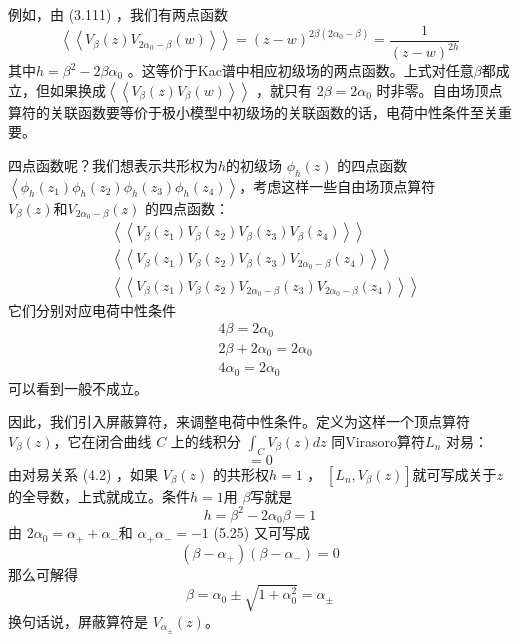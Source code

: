 例如，由 (3.111) ，我们有两点函数
\begin{equation}
	\left\langle\left\langle V_{\beta}(z) V_{2 \alpha_{0}-\beta}(w)\right\rangle\right\rangle=(z-w)^{2 \beta\left(2 \alpha_{0}-\beta\right)}=\frac{1}{(z-w)^{2 h}}
\end{equation}
其中$ h=\beta^{2}-2 \beta \alpha_{0}$ 。这等价于Kac谱中相应初级场的两点函数。上式对任意$ \beta $都成立，但如果换成$\left\langle\left\langle V_{\beta}(z) V_{\beta}(w)\right\rangle\right\rangle$ ，就只有 $2 \beta=2 \alpha_{0}$ 时非零。自由场顶点算符的关联函数要等价于极小模型中初级场的关联函数的话，电荷中性条件至关重要。

四点函数呢？我们想表示共形权为$ h $的初级场 $\phi_{h}(z)$ 的四点函数 $\left\langle\phi_{h}\left(z_{1}\right) \phi_{h}\left(z_{2}\right) \phi_{h}\left(z_{3}\right) \phi_{h}\left(z_{4}\right)\right\rangle $，考虑这样一些自由场顶点算符 $V_{\beta}(z) 和 V_{2 \alpha_{0}-\beta}(z)$ 的四点函数：
\begin{align} &\left\langle\left\langle V_{\beta}\left(z_{1}\right) V_{\beta}\left(z_{2}\right) V_{\beta}\left(z_{3}\right) V_{\beta}\left(z_{4}\right)\right\rangle\right\rangle \\ &\left\langle\left\langle V_{\beta}\left(z_{1}\right) V_{\beta}\left(z_{2}\right) V_{\beta}\left(z_{3}\right) V_{2 \alpha_{0}-\beta}\left(z_{4}\right)\right\rangle\right\rangle \\ &\left\langle\left\langle V_{\beta}\left(z_{1}\right) V_{\beta}\left(z_{2}\right) V_{2 \alpha_{0}-\beta}\left(z_{3}\right) V_{2 \alpha_{0}-\beta}\left(z_{4}\right)\right\rangle\right\rangle \end{align}
它们分别对应电荷中性条件
\begin{align} &4 \beta=2 \alpha_{0}\\ &2 \beta+2 \alpha_{0}=2 \alpha_{0}\\ &4 \alpha_{0}=2 \alpha_{0} \end{align}
可以看到一般不成立。

因此，我们引入屏蔽算符，来调整电荷中性条件。定义为这样一个顶点算符 $V_\beta(z) $，它在闭合曲线 $C$ 上的线积分 $\int_{C} V_{\beta}(z) d z$ 同Virasoro算符$ L_n$ 对易：
\begin{equation}
	[L_{n}, \int_{C} V_{\beta}(z) d z ]=0 
\end{equation}
由对易关系 (4.2) ，如果 $V_\beta(z)$ 的共形权$ h=1$ ， $\left[L_{n}, V_{\beta}(z)\right] $就可写成关于$ z $的全导数，上式就成立。条件$ h=1 $用 $\beta $写就是
\[
h=\beta^{2}-2 \alpha_{0} \beta=1
\]
由 $2 \alpha_{0}=\alpha_{+}+\alpha_{-} $和 $\alpha_{+} \alpha_{-}=-1$ (5.25) 又可写成
$$
\left(\beta-\alpha_{+}\right)\left(\beta-\alpha_{-}\right)=0
$$
那么可解得
\begin{equation}
	\beta=\alpha_{0} \pm \sqrt{1+\alpha_{0}^{2}}=\alpha_{\pm} 
\end{equation}
换句话说，屏蔽算符是 $V_{\alpha_{\pm}}(z) $。

